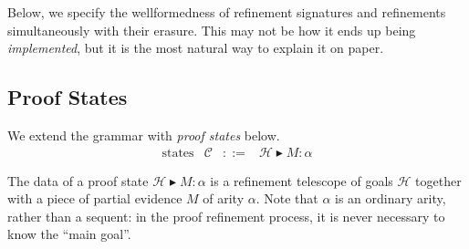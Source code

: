 \documentclass{article}
\newcommand\Ar[2]{[#1]#2}
\newcommand\TlNil{\cdot}
\newcommand\TlSnoc[3]{#1,#2:#3}
\newcommand\Ap[2]{#1[#2]}
\newcommand\WfSrt[2]{{#1}\vdash{#2}\;\textit{sort}}
\newcommand\WfTl[2]{{#1}\vdash{#2}\;\textit{tele}}
\newcommand\WfSp[3]{{#1}\vdash{#2}\Leftarrow{#3}}
\newcommand\HSubst[3]{[#1/#2]#3}
\begin{document}
Below, we specify the wellformedness of refinement signatures and
refinements simultaneously with their erasure. This may not be how it
ends up being \emph{implemented}, but it is the most natural way to
explain it on paper.


\subsection{Proof States}
\newcommand\State[3]{#1\blacktriangleright{#2}:{#3}}
\newcommand\WfState[3]{#1\mathrel{\vdash_{#2}}#3\;\textit{state}}

We extend the grammar with \emph{proof states} below.
\[
  \begin{array}{llll}
    \text{states}
    &\mathcal{C}
    &::=
    &\State{\mathcal{H}}{M}{\alpha}
  \end{array}
\]

The data of a proof state $\State{\mathcal{H}}{M}{\alpha}$ is a
refinement telescope of goals $\mathcal{H}$ together with a piece of
partial evidence $M$ of arity $\alpha$. Note that $\alpha$ is an
ordinary arity, rather than a sequent: in the proof refinement
process, it is never necessary to know the ``main goal''.
\end{document}

